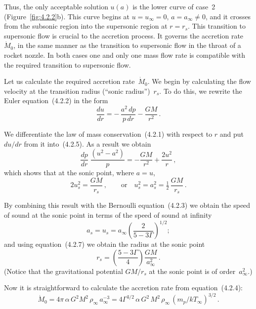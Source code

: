 Thus, the only acceptable solution $u(a)$ is the lower curve of case~2
(Figure~\ref{fig:4.2.2}b).  This curve begins at $u = u_\infty = 0$,
$a = a_\infty \neq 0$, and it crosses from the subsonic region into the
supersonic region at $r = r_s$.  This transition to supersonic flow is
crucial to the accretion process.  It governs the accretion rate~$\dot{M}_0$,
in the same manner as the transition to supersonic flow in the throat of a
rocket nozzle.  In both cases one and only one mass flow rate is compatible
with the required transition to supersonic flow.

Let us calculate the required accretion rate~$\dot{M}_0$.  We begin by
calculating the flow velocity at the transition radius (``sonic
radius'')~$r_s$.  To do this, we rewrite the Euler equation~(4.2.2) in the
form
%
\begin{equation}
\frac{du}{dr} = -\,\frac{a^2\,dp}{p\,dr} - \frac{GM}{r^2}\,.
\tag{4.2.5}
\end{equation}

We differentiate the law of mass conservation~(4.2.1) with respect to $r$
and put $du/dr$ from it into~(4.2.5).  As a result we obtain
%
\begin{equation}
\frac{dp}{dr}\;\frac{(u^2 - a^2)}{p}
  = -\frac{GM}{r^2} + \frac{2u^2}{r}\,,
\tag{4.2.6}
\end{equation}
%
which shows that at the sonic point, where $a = u$,
%
\begin{equation}
2u_s^2 = \frac{GM}{r_s}\,,\qquad \text{or} \quad
u_s^2 = a_s^2 = \tfrac{1}{2}\,\frac{GM}{r_s}\,.
\tag{4.2.7}
\end{equation}

By combining this result with the Bernoulli equation~(4.2.3) we obtain the
speed of sound at the sonic point in terms of the speed of sound at infinity
%
\begin{equation}
a_s = u_s = a_\infty \left(\frac{2}{5-3\Gamma}\right)^{1/2}\!;
\tag{4.2.8}
\end{equation}
%
and using equation~(4.2.7) we obtain the radius at the sonic point
%
\begin{equation}
r_s = \left(\frac{5-3\Gamma}{4}\right)\frac{GM}{a_\infty^2}\,.
\tag{4.2.9}
\end{equation}
%
(Notice that the gravitational potential $GM/r_s$ at the sonic point is of
order~$a_\infty^2$.)

Now it is straightforward to calculate the accretion rate from
equation~(4.2.4):
%
\begin{equation}
\dot{M}_0 = 4\pi\,\alpha\,G^2 M^2\,\rho_\infty\,a_\infty^{-3}
= 4\Gamma^{3/2}\,\alpha\,G^2\,M^2\,\rho_\infty\,
  (m_p / k T_\infty)^{3/2}\,.
\tag{4.2.10}
\end{equation}

